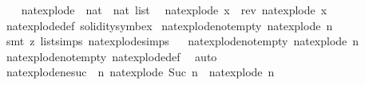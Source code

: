 \begin{isabellebody}
\isanewline
{}\isamarkupfalse%
\ \isanewline
\ \ nat{\isacharunderscore}{\kern0pt}explode\ {\isacharcolon}{\kern0pt}{\isacharcolon}{\kern0pt}\ {\isacartoucheopen}nat\ {\isasymRightarrow}\ nat\ list{\isacartoucheclose}\ \isanewline
\ {\isacartoucheopen}nat{\isacharunderscore}{\kern0pt}explode\ x\ {\isacharequal}{\kern0pt}\ {\isacharparenleft}{\kern0pt}rev\ {\isacharparenleft}{\kern0pt}nat{\isacharunderscore}{\kern0pt}explode{\isacharprime}{\kern0pt}\ x{\isacharparenright}{\kern0pt}{\isacharparenright}{\kern0pt}{\isacartoucheclose}\isanewline
\isanewline
{}\isamarkupfalse%
\ nat{\isacharunderscore}{\kern0pt}explode{\isacharunderscore}{\kern0pt}def\ {\isacharbrackleft}{\kern0pt}solidity{\isacharunderscore}{\kern0pt}symbex{\isacharbrackright}{\kern0pt}\isanewline
\isanewline
{}\isamarkupfalse%
\ nat{\isacharunderscore}{\kern0pt}explode{\isacharprime}{\kern0pt}{\isacharunderscore}{\kern0pt}not{\isacharunderscore}{\kern0pt}empty{\isacharcolon}{\kern0pt}\ {\isacartoucheopen}nat{\isacharunderscore}{\kern0pt}explode{\isacharprime}{\kern0pt}\ n\ {\isasymnoteq}\ {\isacharbrackleft}{\kern0pt}{\isacharbrackright}{\kern0pt}{\isacartoucheclose}\ \isanewline
%
\isadelimproof
\ \ %
\endisadelimproof
%
\isatagproof
{}\isamarkupfalse%
\ {\isacharparenleft}{\kern0pt}smt\ {\isacharparenleft}{\kern0pt}z{}{\isacharparenright}{\kern0pt}\ list{\isachardot}{\kern0pt}simps{\isacharparenleft}{\kern0pt}{}{\isacharparenright}{\kern0pt}\ nat{\isacharunderscore}{\kern0pt}explode{\isacharprime}{\kern0pt}{\isachardot}{\kern0pt}simps{\isacharparenright}{\kern0pt}%
\endisatagproof
{\isafoldproof}%
%
\isadelimproof
\ \isanewline
%
\endisadelimproof
\isanewline
{}\isamarkupfalse%
\ nat{\isacharunderscore}{\kern0pt}explode{\isacharunderscore}{\kern0pt}not{\isacharunderscore}{\kern0pt}empty{\isacharcolon}{\kern0pt}\ {\isacartoucheopen}nat{\isacharunderscore}{\kern0pt}explode\ n\ {\isasymnoteq}\ {\isacharbrackleft}{\kern0pt}{\isacharbrackright}{\kern0pt}{\isacartoucheclose}\isanewline
%
\isadelimproof
\ \ %
\endisadelimproof
%
\isatagproof
{}\isamarkupfalse%
\ nat{\isacharunderscore}{\kern0pt}explode{\isacharprime}{\kern0pt}{\isacharunderscore}{\kern0pt}not{\isacharunderscore}{\kern0pt}empty\ nat{\isacharunderscore}{\kern0pt}explode{\isacharunderscore}{\kern0pt}def\ \isamarkupfalse%
\ auto%
\endisatagproof
{\isafoldproof}%
%
\isadelimproof
\ \isanewline
%
\endisadelimproof
\isanewline
{}\isamarkupfalse%
\ nat{\isacharunderscore}{\kern0pt}explode{\isacharprime}{\kern0pt}{\isacharunderscore}{\kern0pt}ne{\isacharunderscore}{\kern0pt}suc{\isacharcolon}{\kern0pt}\ {\isacartoucheopen}{\isasymexists}\ n{\isachardot}{\kern0pt}\ nat{\isacharunderscore}{\kern0pt}explode{\isacharprime}{\kern0pt}\ {\isacharparenleft}{\kern0pt}Suc\ n{\isacharparenright}{\kern0pt}\ {\isasymnoteq}\ nat{\isacharunderscore}{\kern0pt}explode{\isacharprime}{\kern0pt}\ n{\isacartoucheclose}\isanewline

\end{isabellebody}
